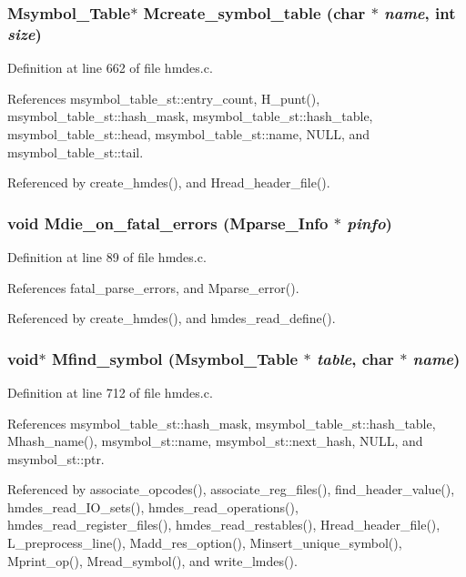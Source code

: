 \subsubsection{\setlength{\rightskip}{0pt plus 5cm}\bf{Msymbol\_\-Table}$\ast$ Mcreate\_\-symbol\_\-table (char $\ast$ {\em name}, int {\em size})}\label{hmdes_8h_9a7308042188883a4be25b3e0ee777d0}




Definition at line 662 of file hmdes.c.

References msymbol\_\-table\_\-st::entry\_\-count, H\_\-punt(), msymbol\_\-table\_\-st::hash\_\-mask, msymbol\_\-table\_\-st::hash\_\-table, msymbol\_\-table\_\-st::head, msymbol\_\-table\_\-st::name, NULL, and msymbol\_\-table\_\-st::tail.

Referenced by create\_\-hmdes(), and Hread\_\-header\_\-file().
\subsubsection{\setlength{\rightskip}{0pt plus 5cm}void Mdie\_\-on\_\-fatal\_\-errors (\bf{Mparse\_\-Info} $\ast$ {\em pinfo})}\label{hmdes_8h_c86bbf19bc7a087f23ce6dabbcc0ba13}




Definition at line 89 of file hmdes.c.

References fatal\_\-parse\_\-errors, and Mparse\_\-error().

Referenced by create\_\-hmdes(), and hmdes\_\-read\_\-define().
\subsubsection{\setlength{\rightskip}{0pt plus 5cm}void$\ast$ Mfind\_\-symbol (\bf{Msymbol\_\-Table} $\ast$ {\em table}, char $\ast$ {\em name})}\label{hmdes_8h_6bcfff652cd0e21dc304d3b05c230a52}




Definition at line 712 of file hmdes.c.

References msymbol\_\-table\_\-st::hash\_\-mask, msymbol\_\-table\_\-st::hash\_\-table, Mhash\_\-name(), msymbol\_\-st::name, msymbol\_\-st::next\_\-hash, NULL, and msymbol\_\-st::ptr.

Referenced by associate\_\-opcodes(), associate\_\-reg\_\-files(), find\_\-header\_\-value(), hmdes\_\-read\_\-IO\_\-sets(), hmdes\_\-read\_\-operations(), hmdes\_\-read\_\-register\_\-files(), hmdes\_\-read\_\-restables(), Hread\_\-header\_\-file(), L\_\-preprocess\_\-line(), Madd\_\-res\_\-option(), Minsert\_\-unique\_\-symbol(), Mprint\_\-op(), Mread\_\-symbol(), and write\_\-lmdes().
